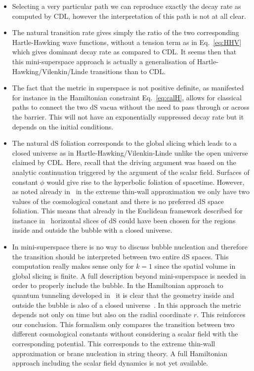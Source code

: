 \documentclass[a4paper,11pt]{article}
\numberwithin{equation}{section}
\begin{document}
 \begin{itemize}
 \item Selecting a very particular path we can reproduce exactly the decay rate as computed by CDL, however the interpretation of this path is not at all clear.
 
 \item The natural transition rate gives simply the ratio of the two corresponding Hartle-Hawking wave functions, without a tension term as in Eq.~\eqref{eq:HHV} which gives dominant decay rate as compared to CDL. It seems then that this mini-superspace approach is actually a generalisation of Hartle-Hawking/Vilenkin/Linde transitions than to CDL.
 
 \item The fact that the metric in superspace is not positive definite, as manifested for instance in the Hamiltonian constraint Eq.~\eqref{eq:calH}, allows for classical paths to connect the two dS vacua without the need to pass through or across the barrier. This will not have an exponentially suppressed decay rate but it depends on the initial conditions.
 
 \item The natural dS foliation corresponds to the global slicing which leads to a closed universe as in Hartle-Hawking/Vilenkin-Linde unlike the open universe claimed by CDL. Here, recall that the driving argument was based on the analytic continuation triggered by the argument of the scalar field. Surfaces of constant $\phi$ would give rise to the hyperbolic foliation of spacetime. However, as noted already in~\cite{Coleman:1980aw} in the extreme thin-wall approximation we only have two values of the cosmological constant and there is no preferred dS space foliation. This means that already in the Euclidean framework described for instance in~\cite{Brown:1988kg} horizontal slices of dS could have been chosen for the regions inside and outside the bubble with a closed universe.
 
 \item In mini-superspace there is no way to discuss bubble nucleation and therefore the transition should be interpreted between two entire dS spaces. This computation really makes sense only for $k=1$  since the spatial volume in global slicing is finite. A full description beyond mini-superspace is needed in order to properly include the bubble. 
In the Hamiltonian approach to quantum tunneling developed in~\cite{Fischler:1989se,Fischler:1990pk} it is clear that the geometry inside and outside the bubble is also of a closed universe~\cite{deAlwis:2019dkc}. In this approach  the metric depends not only on time but also on the radial coordinate $r$. This reinforces our conclusion. This formalism only compares the transition between two different cosmological constants without considering a scalar field with the corresponding potential. This corresponds to the extreme thin-wall approximation or brane nucleation in string theory. A full Hamiltonian approach including the scalar field dynamics is not yet available.


\end{itemize}
\end{document}
